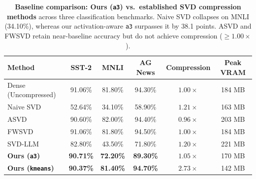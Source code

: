 \begin{table}[t]
\centering
\caption{\textbf{Baseline comparison: Ours (\texttt{a3}) vs.\ established SVD compression methods} across three classification benchmarks.
Naive SVD collapses on MNLI (34.10\%), whereas our activation-aware \texttt{a3} surpasses it by 38.1 points.
ASVD and FWSVD retain near-baseline accuracy but do not achieve compression ($\ge1.00\times$).}
\label{tab:baselines}
\small
\setlength{\tabcolsep}{5pt}
\begin{tabular}{lccc|cc}
\toprule
\textbf{Method} & \textbf{SST-2} & \textbf{MNLI} & \textbf{AG News} & \textbf{Compression} & \textbf{Peak VRAM} \\
\midrule
Dense (Uncompressed)  & 91.06\% & 81.80\% & 94.30\% & $1.00\times$ & 184 MB \\
Naive SVD             & 52.64\% & 34.10\% & 58.90\% & $1.21\times$ & 163 MB \\
ASVD                  & 90.60\% & 82.00\% & 94.40\% & $0.96\times$ & 203 MB \\
FWSVD                 & 91.06\% & 81.80\% & 94.50\% & $1.00\times$ & 184 MB \\
SVD-LLM               & 82.80\% & 43.50\% & 71.80\% & $1.20\times$ & 221 MB \\
\midrule
\textbf{Ours (\texttt{a3})}  & \textbf{90.71\%} & \textbf{72.20\%} & \textbf{89.30\%} & $1.05\times$ & 170 MB \\
\textbf{Ours (\texttt{kmeans})}  & \textbf{90.37\%} & \textbf{81.40\%} & \textbf{94.70\%} & $\mathbf{2.73\times}$ & 142 MB \\
\bottomrule
\end{tabular}
\end{table}
